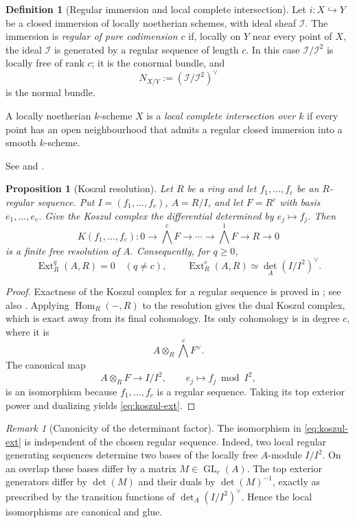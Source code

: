 \documentclass[11pt,a4paper]{article}
\newtheorem{proposition}[theorem]{Proposition}
\theoremstyle{definition}
\newtheorem{definition}[theorem]{Definition}
\theoremstyle{remark}
\newtheorem{remark}[theorem]{Remark}
\newcommand{\II}{\mathcal I}
\newcommand{\Hom}{\operatorname{Hom}}
\newcommand{\Ext}{\operatorname{Ext}}
\newcommand{\dual}{^{\vee}}
\newcommand{\determinant}{\operatorname{det}}
\begin{document}
\begin{definition}[Regular immersion and local complete intersection]
Let $i:X\hookrightarrow Y$ be a closed immersion of locally noetherian
schemes, with ideal sheaf $\II$. The immersion is \emph{regular of pure
codimension $c$} if, locally on $Y$ near every point of $X$, the ideal $\II$
is generated by a regular sequence of length $c$. In this case
$\II/\II^2$ is locally free of rank $c$; it is the conormal bundle, and
\[
  N_{X/Y}:=(\II/\II^2)\dual
\]
is the normal bundle.

A locally noetherian $k$-scheme $X$ is a \emph{local complete intersection
over $k$} if every point has an open neighbourhood that admits a regular
closed immersion into a smooth $k$-scheme.
\end{definition}

See \cite[Chapter II, Section 8]{HartshorneAG} and
\cite[Tags 0638 and 067M]{Stacks}.

\begin{proposition}[Koszul resolution]
\label{prop:koszul-resolution}
Let $R$ be a ring and let $f_1,\ldots,f_c$ be an $R$-regular sequence.
Put $I=(f_1,\ldots,f_c)$, $A=R/I$, and let $F=R^c$ with basis
$e_1,\ldots,e_c$. Give the Koszul complex the differential determined by
$e_j\mapsto f_j$. Then
\[
  K(f_1,\ldots,f_c):
  0\to\bigwedge^cF\to\cdots\to\bigwedge^1F\to R\to0
\]
is a finite free resolution of $A$. Consequently, for $q\geq0$,
\begin{equation}\label{eq:koszul-ext}
  \Ext_R^q(A,R)=0\quad(q\neq c),
  \qquad
  \Ext_R^c(A,R)
  \simeq\determinant_A(I/I^2)\dual.
\end{equation}
\end{proposition}

\begin{proof}
Exactness of the Koszul complex for a regular sequence is proved in
\cite[Chapter III, Proposition 7.10A]{HartshorneAG}; see also
\cite[Section 1.6]{BrunsHerzog}. Applying $\Hom_R(-,R)$ to the resolution
gives the dual Koszul complex, which is exact away from its final
cohomology. Its only cohomology is in degree $c$, where
it is
\[
  A\otimes_R\bigwedge^cF\dual.
\]
The canonical map
\[
  A\otimes_R F\longrightarrow I/I^2,
  \qquad e_j\longmapsto f_j\bmod I^2,
\]
is an isomorphism because $f_1,\ldots,f_c$ is a regular sequence. Taking its
top exterior power and dualizing yields \eqref{eq:koszul-ext}.
\end{proof}

\begin{remark}[Canonicity of the determinant factor]
The isomorphism in \eqref{eq:koszul-ext} is independent of the chosen regular
sequence. Indeed, two local regular generating sequences determine two bases
of the locally free $A$-module $I/I^2$. On an overlap these bases differ by a
matrix $M\in\operatorname{GL}_c(A)$. The top exterior generators differ by
$\det(M)$ and their duals by $\det(M)^{-1}$, exactly as prescribed by the
transition functions of $\determinant_A(I/I^2)\dual$. Hence the local
isomorphisms are canonical and glue.
\end{remark}
\end{document}
